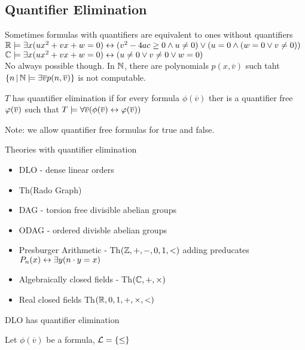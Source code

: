 
\subsection{Quantifier Elimination}

Sometimes formulas with quantifiers are equivalent to ones without quantifiers
$\mathbb{R} \models \exists x (ux^2 + vx + w=0) \leftrightarrow (v^2 - 4ac \ge 0 \wedge u \neq 0) \vee (u = 0 \wedge (w=0 \vee v \neq 0))$ \\
$\mathbb{C} \models \exists x (ux^2 + vx + w=0) \leftrightarrow (u \neq 0 \vee v \neq 0 \vee w=0)$ \\

No always possible though. In $\mathbb{N}$, there are polynomials $p(x, \overline{v})$ such taht $\{n \, | \, \mathbb{N} \models \exists \overline{v} p(n, \overline{v})\}$ is not computable. 

\begin{definition}
    $T$ has quantifier elimination if for every formula $\phi(\overline{v})$ ther is a quantifier free $\varphi(\overline{v})$ such that $T \models \forall \overline{v} (\phi(\overline{v}) \leftrightarrow \varphi(\overline{v}))$ 
\end{definition}

\noindent
Note: we allow quantifier free formulas for true and false. \\

\begin{example}
    Theories with quantifier elimination 
    \begin{itemize}
        \item DLO - dense linear orders 
        \item Th(Rado Graph)
        \item DAG - torsion free divisible abelian groups 
        \item ODAG - ordered divisble abelian groups 
        \item Presburger Arithmetic - Th$(\mathbb{Z}, + , - , 0, 1, <)$ adding preducates $P_n(x) \leftrightarrow \exists y(n \cdot y = x)$
        \item Algebraically closed fields - Th$(\mathbb{C}, +, \times)$
        \item Real closed fields Th$(\mathbb{R}, 0, 1, + , \times, < )$ 
    \end{itemize}
\end{example}

\begin{theorem}
    DLO has quantifier elimination
\end{theorem}

\begin{pf}
    Let $\phi(\overline{v})$ be a formula, $\mathcal{L} = \{\le \}$ 
\end{pf}


